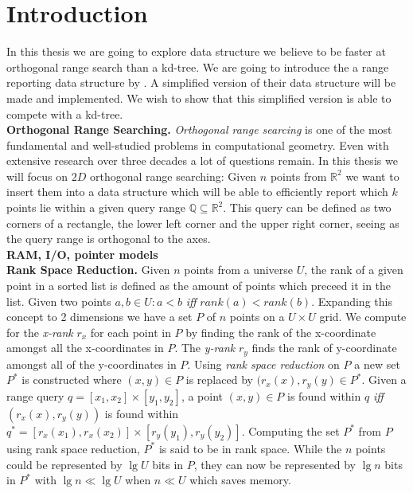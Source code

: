 \chapter{Introduction}
\label{ch:intro}

In this thesis we are going to explore data structure we believe to be faster at orthogonal range search than a kd-tree. We are going to introduce the a range reporting data structure by \citet{chanetal}. A simplified version of their data structure will be made and implemented. We wish to show that this simplified version is able to compete with a kd-tree. \\

\noindent \textbf{Orthogonal Range Searching.} \emph{Orthogonal range searcing} is one of the most fundamental and well-studied problems in computational geometry. Even with extensive research over three decades a lot of questions remain. In this thesis we will focus on $2D$ orthogonal range searching: Given $n$ points from $\mathbb{R}^2$ we want to insert them into a data structure which will be able to efficiently report which $k$ points lie within a given query range $\mathbb{Q} \subseteq \mathbb{R}^2$. This query can be defined as two corners of a rectangle, the lower left corner and the upper right corner, seeing as the query range is orthogonal to the axes. \\

\noindent \textbf{RAM, I/O, pointer models} \\

\noindent \textbf{Rank Space Reduction.} Given $n$ points from a universe $U$, the rank of a given point in a sorted list is defined as the amount of points which preceed it in the list. Given two points $a,b \in U: a < b$ \emph{iff} $rank(a) < rank(b)$. Expanding this concept to 2 dimensions we have a set $P$ of $n$ points on a $U \times U$ grid. We compute for the \emph{x-rank} $r_x$ for each point in $P$ by finding the rank of the x-coordinate amongst all the x-coordinates in $P$. The \emph{y-rank} $r_y$ finds the rank of y-coordinate amongst all of the y-coordinates in $P$. Using \emph{rank space reduction} on $P$ a new set $P^*$ is constructed where $(x,y) \in P$ is replaced by $(r_x(x), r_y(y) \in P^*$. Given a range query $q = [x_1, x_2] \times [y_1, y_2]$, a point $(x,y) \in P$ is found within $q$ \emph{iff} $(r_x(x), r_y(y))$ is found within $q^* = [r_x(x_1), r_x(x_2)] \times [r_y(y_1), r_y(y_2)]$.  Computing the set $P^*$ from $P$ using rank space reduction, $P^*$ is said to be in rank space. While the $n$ points could be represented by $\lg U$ bits in $P$, they can now be represented by $\lg n$ bits in $P^*$ with $\lg n \ll \lg U$ when $n \ll U$ which saves memory.  \\


